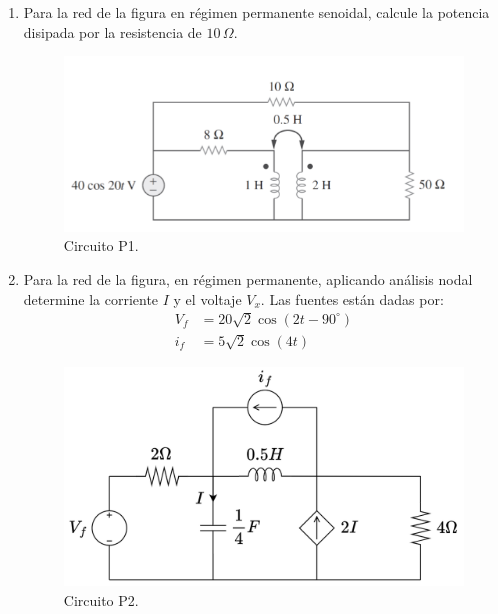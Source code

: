 \documentclass[
	spanish, %
	letterpaper, oneside
]{article}
\begin{document}
\templatePagecfg

\begin{enumerate}
    \item Para la red de la figura en régimen permanente senoidal, calcule la potencia disipada por la resistencia de $10\,\Omega$.


    \begin{figure}[h!]
        \centering
        \includegraphics[width=0.55\linewidth]{img/Examen_1_1.png}
        \caption{Circuito P1.}
        \label{fig:p1}
    \end{figure}
    
   \item Para la red de la figura, en régimen permanente, aplicando análisis nodal determine la corriente $I$ y el voltaje $V_x$. Las fuentes están dadas por:
    \begin{align*}
        V_f &= 20\sqrt{2}\cos(2t - 90^\circ) \\
        i_f &= 5\sqrt{2}\cos(4t)
    \end{align*}

    \begin{figure}[h!]
        \centering
        \includegraphics[width=0.5\linewidth]{img/Figura_6}
        \caption{Circuito P2.}
        \label{fig:p2}
    \end{figure}


\end{enumerate}
\end{document}
